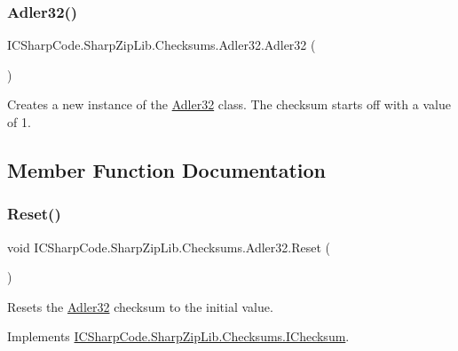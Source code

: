 \subsubsection{\texorpdfstring{Adler32()}{Adler32()}\hspace{0.1cm}{\footnotesize\ttfamily [2/2]}}
{\footnotesize\ttfamily I\+C\+Sharp\+Code.\+Sharp\+Zip\+Lib.\+Checksums.\+Adler32.\+Adler32 (\begin{DoxyParamCaption}{ }\end{DoxyParamCaption})\hspace{0.3cm}{\ttfamily [inline]}}



Creates a new instance of the \hyperlink{class_i_c_sharp_code_1_1_sharp_zip_lib_1_1_checksums_1_1_adler32}{Adler32} class. The checksum starts off with a value of 1. 



\subsection{Member Function Documentation}
\mbox{\label{class_i_c_sharp_code_1_1_sharp_zip_lib_1_1_checksums_1_1_adler32_ab508a341e82f164dfbb744188614caeb}} 
\subsubsection{\texorpdfstring{Reset()}{Reset()}\hspace{0.1cm}{\footnotesize\ttfamily [1/2]}}
{\footnotesize\ttfamily void I\+C\+Sharp\+Code.\+Sharp\+Zip\+Lib.\+Checksums.\+Adler32.\+Reset (\begin{DoxyParamCaption}{ }\end{DoxyParamCaption})\hspace{0.3cm}{\ttfamily [inline]}}



Resets the \hyperlink{class_i_c_sharp_code_1_1_sharp_zip_lib_1_1_checksums_1_1_adler32}{Adler32} checksum to the initial value. 



Implements \hyperlink{interface_i_c_sharp_code_1_1_sharp_zip_lib_1_1_checksums_1_1_i_checksum_a43ef0e6e9e22a503da94790835a0a384}{I\+C\+Sharp\+Code.\+Sharp\+Zip\+Lib.\+Checksums.\+I\+Checksum}.

